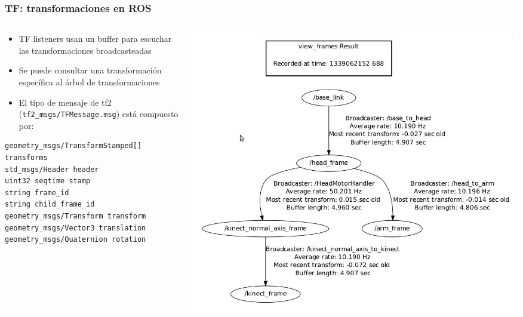\begin{frame}[fragile]
    \frametitle{TF: transformaciones en ROS}
    \footnotesize
        \begin{columns}
    	\begin{column}{0.5\textwidth}
		    \begin{itemize}
				\item TF listeners usan un buffer para escuchar las transformaciones broadcasteadas
				\item Se puede consultar una transformación específica al árbol de transformaciones
                \item El tipo de mensaje de tf2 (\lstinline[style=bash]{tf2_msgs/TFMessage.msg}) está compuesto por:
			\end{itemize}
\begin{lstlisting}[style=bash] 
geometry_msgs/TransformStamped[] transforms
std_msgs/Header header
uint32 seqtime stamp
string frame_id
string child_frame_id
geometry_msgs/Transform transform
geometry_msgs/Vector3 translation
geometry_msgs/Quaternion rotation
\end{lstlisting}
    	\end{column}
    	\begin{column}{0.5\textwidth}
    		\includegraphics[width=\columnwidth]{images/tf2_tree_graph.png}
    	\end{column}
    \end{columns}
\end{frame}

